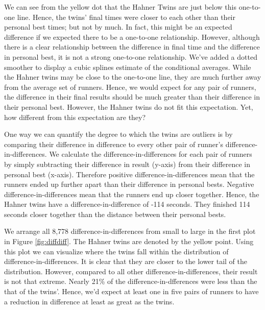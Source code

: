 \documentclass[12pt,titlepage]{article}
\begin{document}

We can see from the yellow dot that the Hahner Twins are just below this one-to-one line.  Hence, the twins' final times were closer to each other than their personal best times; but not by much.  In fact, this might be an expected difference if we expected there to be a one-to-one relationship.     However, although there is a clear relationship between the difference in final time and the difference in personal best, it is not a strong one-to-one relationship.  We've added a dotted smoother to display a cubic splines estimate of the conditional averages.  While the Hahner twins may be close to the one-to-one line, they are much further away from the average set of runners.  Hence, we would expect for any pair of runners, the difference in their final results should be much greater than their difference in their personal best.  However, the Hahner twins do not fit this expectation.   Yet, how different from this expectation are they?

One way we can quantify the degree to which the twins are outliers is by comparing their difference in difference to every other pair of runner's difference-in-differences.  We calculate the difference-in-differences for each pair of runners by simply subtracting their difference in result (y-axis) from their difference in personal best (x-axis).  Therefore positive difference-in-differences mean that the runners ended up further apart than their difference in personal bests.  Negative difference-in-differences mean that the runners end up closer together.  Hence, the Hahner twins have a difference-in-difference of -114 seconds.  They finished 114 seconds closer together than the distance between their personal bests.  

We arrange all 8,778 difference-in-differences from small to large in the first plot in Figure \ref{fig:diffdiff}. The Hahner twins are denoted by the yellow point.  Using this plot we can visualize where the twins fall within the distribution of difference-in-differences.  It is clear that they are closer to the lower tail of the distribution.  However, compared to all other difference-in-differences, their result is not that extreme.  Nearly 21\% of the difference-in-dfferences were less than the that of the twins'. Hence, we'd expect at least one in five pairs of runners to have a reduction in difference at least as great as the twins.
\end{document}
